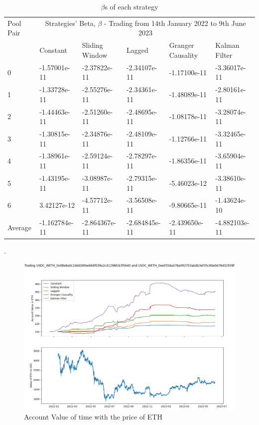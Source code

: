 \begin{table}[H]
    \centering
    \begin{adjustwidth}{-0.8in}{-0.9in}
        \begin{tabular}{|p{5em}|p{7em}|p{7em}|p{7em}|p{8em}|p{7em}|}\hline
            Pool Pair & \multicolumn{5}{|c|}{Strategies' Beta, $\beta$ - Trading from 14th January 2022 to 9th June 2023} \\\cline{1-6}
            & Constant & Sliding Window & Lagged & Granger Causality & Kalman Filter\\\cline{2-6}
            0 & -1.57001e-11 & -2.37822e-11 & -2.34107e-11 & -1.17100e-11 & -3.36017e-11\\\cline{2-6}
            1 & -1.33728e-11 & -2.55276e-11 & -2.34361e-11 & -1.48089e-11 & -2.80161e-11\\\cline{2-6}
            2 & -1.44463e-11 & -2.51260e-11 & -2.48695e-11 & -1.08178e-11 & -3.28074e-11\\\cline{2-6}
            3 & -1.30815e-11 & -2.34876e-11 & -2.48109e-11 & -1.12766e-11 & -3.32465e-11\\\cline{2-6}
            4 & -1.38961e-11 & -2.59124e-11 & -2.78297e-11 & -1.86356e-11 & -3.65904e-11\\\cline{2-6}
            5 & -1.43195e-11 & -3.08987e-11 & -2.79315e-11 & -5.46023e-12 & -3.38610e-11\\\cline{2-6}
            6 & 3.42127e-12 & -4.57712e-11 & -3.56508e-11 & -9.80665e-11 & -1.43624e-10\\\hline\hline
            Average & -1.162784e-11 & -2.864367e-11 & -2.684845e-11 & -2.439650e-11 & -4.882103e-11\\\hline
        \end{tabular}
    \end{adjustwidth}
    \caption{$\beta$s of each strategy \label{tab:betas}}.
\end{table}

\begin{figure}[H]
    \centering
    \includegraphics[width=\linewidth]{evaluation/Images/beta_visualisation.png}
    \caption{Account Value of time with the price of ETH}
    \label{fig:beta-vis}
\end{figure}

